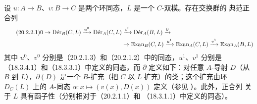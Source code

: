 \begin{theorem}[20.2.2]
\label{0.20.2.2-fr}
设 $u:A\to B$、$v:B\to C$ 是两个环同态，$L$ 是一个 $C$-双模。存在交换群的
典范正合列
\begin{align}
\tag{20.2.2.1}
\label{0.20.2.2.1-fr}
  0\to\operatorname{D\acute{e}r}_B(C,L)\xrightarrow{u^0}
  \operatorname{D\acute{e}r}_A(C,L)&\xrightarrow{v^0}
  \operatorname{D\acute{e}r}_A(B,L)\xrightarrow{\partial} \\
  &\to\operatorname{Exan}_B(C,L)\xrightarrow{u^1}
  \operatorname{Exan}_A(C,L)\xrightarrow{v^1}
  \operatorname{Exan}_A(B,L) \notag
\end{align}
其中 $u^0$、$v^0$ 分别是（20.2.1.3）和（20.2.1.2）中的同态，$u^1$、$v^1$
分别是（18.3.4.1）和（18.3.3.1）中定义的同态，而 $\partial$ 定义如下：对任意
$A$-导射 $D$（从 $B$ 到 $L$），$\partial(D)$ 是一个 $B$-扩充（把 $C$ 以
$L$ 扩充）的类；这个扩充由环 $D_C(L)$ 上的 $A$-同态
$\alpha:x\mapsto(v(x),D(x))$ 定义（参见 ）。此外，正合列
 关于 $L$ 具有函子性（分别相对于（20.2.1.1）和
（18.3.1.1）中定义的同态）。
\end{theorem}

